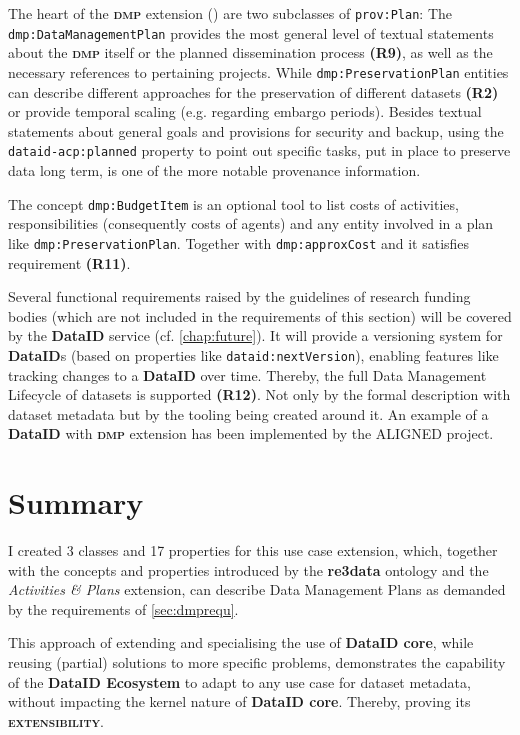 \documentclass[a4paper,english,twoside,BCOR1.5cm,headsepline,DIV12,appendixprefix,final,12pt]{scrbook}
\newcommand{\extensibility}{{\ttfamily\scshape\bfseries extensibility}\xspace}
\newcommand{\ecosystem}{{\ttfamily\bfseries DataID Ecosystem}\xspace}
\newcommand{\dataid}{{\ttfamily\bfseries DataID}\xspace}
\newcommand{\core}{{\ttfamily\bfseries DataID core}\xspace}
\newcommand{\dmp}{{\scshape\bfseries dmp}\xspace}
\newcommand{\dbpedia}{{\ttfamily\bfseries DBpedia}\xspace}
\newcommand{\redata}{{\ttfamily\bfseries re3data}\xspace}
\newcommand{\prop}[1]{{{\texttt{#1}}}}
\newcommand\footnoteurl[1]{\footnote{\scriptsize\url{#1}}}
\begin{document}
The heart of the \dmp extension () are two subclasses of \prop{prov:Plan}:
The \prop{dmp:DataManagementPlan} provides the most general level of textual statements about the \dmp itself or the planned dissemination process \textbf{(R9)}, as well as the necessary references to pertaining projects. While \prop{dmp:PreservationPlan} entities can describe different approaches for the preservation of different datasets \textbf{(R2)} or provide temporal scaling (e.g. regarding embargo periods). Besides textual statements about general goals and provisions for security and backup, using the \prop{dataid-acp:planned} property to point out specific tasks, put in place to preserve data long term, is one of the more notable provenance information.

The concept \prop{dmp:BudgetItem} is an optional tool to list costs of activities, responsibilities (consequently costs of agents) and any entity involved in a plan like \prop{dmp:PreservationPlan}. Together with \prop{dmp:approxCost} and\hfill \break \prop{dmp:justification} it satisfies requirement \textbf{(R11)}.

Several functional requirements raised by the guidelines of research funding bodies (which are not included in the requirements of this section) will be covered by the \dataid service (cf. \cref{chap:future}). It will provide a versioning system for \dataid{}s (based on properties like \prop{dataid:nextVersion}), enabling features like tracking changes to a \dataid over time.
Thereby, the full Data Management Lifecycle of datasets is supported \textbf{(R12)}. Not only by the formal description with dataset metadata but by the tooling being created around it. 
An example of a \dataid with \dmp extension has been implemented by the ALIGNED project. 

\section{Summary} 
\label{sec:dmpsummary}
I created 3 classes and 17 properties for this use case extension, which, together with the concepts and properties introduced by the \redata ontology and the \textit{Activities \& Plans} extension, can describe Data Management Plans as demanded by the requirements of \cref{sec:dmprequ}. 

This approach of extending and specialising the use of \core, while reusing (partial) solutions to more specific problems, demonstrates the capability of the \ecosystem to adapt to any use case for dataset metadata, without impacting the kernel nature of \core. Thereby, proving its \extensibility.
\end{document}
